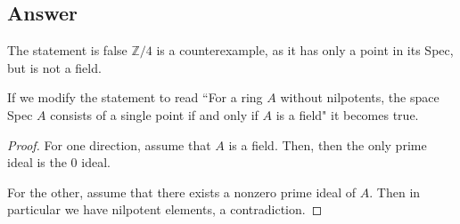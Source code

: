 \documentclass[11pt]{article}
\begin{document}
\subsection{Answer}

The statement is false $\mathbb{Z}/4$ is a counterexample, as it has only a point in its Spec, but is not  a field.

If we modify the statement to read ``For a ring $A$ without nilpotents, the space Spec $A$ consists of a single point if and only if $A$ is a field" it becomes true.
\begin{proof}
For one direction, assume that $A$ is a field. Then, then the only prime ideal is the 0 ideal.

For the other, assume that there exists a nonzero prime ideal of $A$.  Then in particular we have nilpotent elements, a contradiction.	 
\end{proof}
\end{document}
